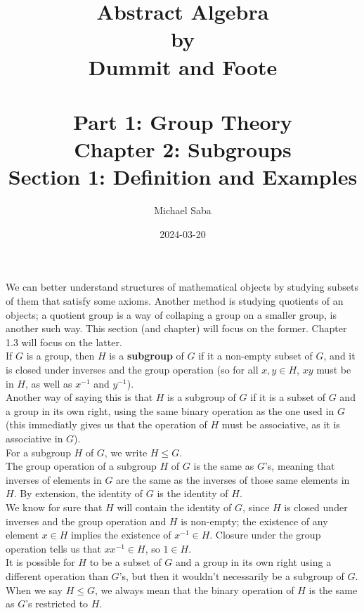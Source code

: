 \documentclass[12pt]{article}
\title{%
    \Huge Abstract Algebra \\
    \large by \\
    \Large Dummit and Foote \\~\\
    \huge Part 1: Group Theory \\
    \LARGE Chapter 2: Subgroups \\
    \Large Section 1: Definition and Examples 
}
\date{2024-03-20}
\author{Michael Saba}
\begin{document}
    \maketitle
    \newpage

    
    We can better understand structures of mathematical objects
    by studying subsets of them that satisfy some axioms.
    Another method is studying quotients of an objects;
    a quotient group is a way of collaping a group on a smaller group,
    is another such way.
    This section (and chapter) will focus on the former.
    Chapter 1.3 will focus on the latter. \\
    
    If $G$ is a group, then $H$ is a \textbf{subgroup} of $G$
    if it a non-empty subset of $G$, and it is closed under
    inverses and the group operation
    (so for all $x, y \in H$, $xy$ must be in $H$,
    as well as $x^{-1}$ and $y^{-1}$). \\
    Another way of saying this is that $H$ is a subgroup of $G$
    if it is a subset of $G$ and a group in its own right,
    using the same binary operation as the one used in $G$
    (this immediatly gives us that the operation of $H$
    must be associative, as it is associative in $G$). \\
    For a subgroup $H$ of $G$, we write $H \leqslant G$. \\

    The group operation of a subgroup $H$ of $G$ is the same as $G$'s,
    meaning that inverses of elements in $G$
    are the same as the inverses of those same elements in $H$.
    By extension, the identity of $G$ is the identity of $H$. \\
    We know for sure that $H$ will contain the identity of $G$,
    since $H$ is closed under inverses and the group operation
    and $H$ is non-empty;
    the existence of any element $x \in H$ implies
    the existence of $x^{-1} \in H$.
    Closure under the group operation tells us that $xx^{-1} \in H$,
    so $1 \in H$. \\

    It is possible for $H$ to be a subset of $G$
    and a group in its own right using a different operation than $G$'s,
    but then it wouldn't necessarily be a subgroup of $G$.
    When we say $H \leqslant G$,
    we always mean that the binary operation of $H$ is the same as $G$'s
    restricted to $H$. \\
\end{document}
